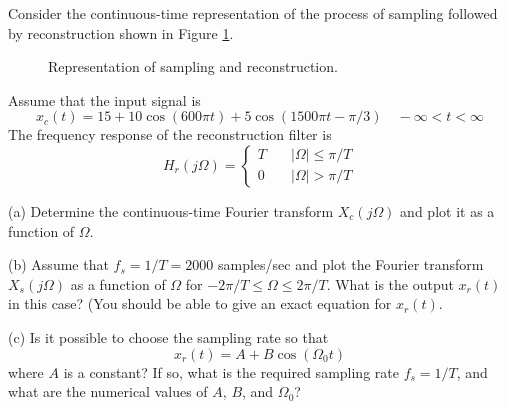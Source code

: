 \documentclass[12pt]{report}
\begin{document}
\newpage
{}

Consider the continuous-time representation of the process of sampling
followed by reconstruction shown in Figure \ref{fig:sampreconst}.
\begin{figure}[h]
\centering

\caption{Representation of sampling and reconstruction.\label{fig:sampreconst}}
\end{figure}

Assume that the input signal is
\[
x_c(t)= 15 + 10\cos(600\pi t)+ 5\cos(1500\pi t - \pi/3) \quad
-\infty < t < \infty
\]
The frequency response of the reconstruction filter is
\[
H_r(j\Omega) = \left\{\begin{array}{ll}
    T& \quad |\Omega|\leq \pi/T \\
    0& \quad |\Omega| > \pi/T
    \end{array} \right.
\]

\begin{description}
\item{(a)} Determine the continuous-time Fourier transform
$X_c(j\Omega)$ and plot it as a function of $\Omega$.
    \item{(b)} Assume that $f_s=1/T=2000$ samples/sec and plot the Fourier
        transform $X_s(j\Omega)$  as a function of $\Omega$ for $-2\pi/T
        \leq \Omega \leq 2\pi/T$.  What is the output $x_r(t)$ in this
        case? (You should be able to give an exact equation for $x_r(t)$.
    \item{(c)}
    Is it possible to choose the sampling rate so that
    \[
    x_r(t)=A + B\cos(\Omega_{0} t )
    \]
    where $A$ is a constant?  If so, what is the required sampling rate
    $f_s=1/T$, and what are the numerical values of $A$, $B$, and $\Omega_{0}$?
\end{description}
\mbox{}\\

\end{document}
